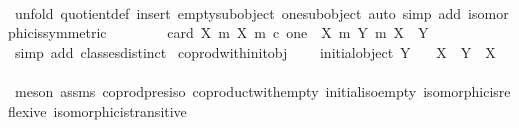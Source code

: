 \begin{isabellebody}
\ \ \ \ \ \ \isamarkupfalse%
\ {\isacharparenleft}{\kern0pt}unfold\ quotient{\isacharunderscore}{\kern0pt}def{\isacharcomma}{\kern0pt}\ insert\ empty{\isacharunderscore}{\kern0pt}subobject\ one{\isacharunderscore}{\kern0pt}subobject{\isacharcomma}{\kern0pt}\ auto\ simp\ add{\isacharcolon}{\kern0pt}\ isomorphic{\isacharunderscore}{\kern0pt}is{\isacharunderscore}{\kern0pt}symmetric{\isacharparenright}{\kern0pt}\isanewline
\ \ \isamarkupfalse%
\isanewline
\ \ \isamarkupfalse%
\ \isamarkupfalse%
\ {\isachardoublequoteopen}card\ {\isacharparenleft}{\kern0pt}{\isacharbraceleft}{\kern0pt}{\isacharparenleft}{\kern0pt}X{\isacharcomma}{\kern0pt}\ m{\isacharparenright}{\kern0pt}{\isachardot}{\kern0pt}\ {\isacharparenleft}{\kern0pt}X{\isacharcomma}{\kern0pt}\ m{\isacharparenright}{\kern0pt}\ {\isasymsubseteq}\isactrlsub c\ one{\isacharbraceright}{\kern0pt}\ {\isacharslash}{\kern0pt}{\isacharslash}{\kern0pt}\ {\isacharbraceleft}{\kern0pt}{\isacharparenleft}{\kern0pt}{\isacharparenleft}{\kern0pt}X{\isacharcomma}{\kern0pt}\ m{}{\isacharparenright}{\kern0pt}{\isacharcomma}{\kern0pt}\ {\isacharparenleft}{\kern0pt}Y{\isacharcomma}{\kern0pt}\ m{}{\isacharparenright}{\kern0pt}{\isacharparenright}{\kern0pt}{\isachardot}{\kern0pt}\ X\ {\isasymcong}\ Y{\isacharbraceright}{\kern0pt}{\isacharparenright}{\kern0pt}\ {\isacharequal}{\kern0pt}\ {}{\isachardoublequoteclose}\isanewline
\ \ \ \ \isamarkupfalse%
\ {\isacharparenleft}{\kern0pt}simp\ add{\isacharcolon}{\kern0pt}\ classes{\isacharunderscore}{\kern0pt}distinct{\isacharparenright}{\kern0pt}\isanewline
{}\isamarkupfalse%
%
\endisatagproof
{\isafoldproof}%
%
\isadelimproof
\isanewline
%
\endisadelimproof
\isanewline
{}\isamarkupfalse%
\ coprod{\isacharunderscore}{\kern0pt}with{\isacharunderscore}{\kern0pt}init{\isacharunderscore}{\kern0pt}obj{}{\isacharcolon}{\kern0pt}\ \isanewline
\ \ \ {\isachardoublequoteopen}initial{\isacharunderscore}{\kern0pt}object\ Y{\isachardoublequoteclose}\isanewline
\ \ \ {\isachardoublequoteopen}X\ {\isasymCoprod}\ Y\ {\isasymcong}\ X{\isachardoublequoteclose}\isanewline
%
\isadelimproof
\ \ %
\endisadelimproof
%
\isatagproof
{}\isamarkupfalse%
\ {\isacharparenleft}{\kern0pt}meson\ assms\ coprod{\isacharunderscore}{\kern0pt}pres{\isacharunderscore}{\kern0pt}iso\ coproduct{\isacharunderscore}{\kern0pt}with{\isacharunderscore}{\kern0pt}empty\ initial{\isacharunderscore}{\kern0pt}iso{\isacharunderscore}{\kern0pt}empty\ isomorphic{\isacharunderscore}{\kern0pt}is{\isacharunderscore}{\kern0pt}reflexive\ isomorphic{\isacharunderscore}{\kern0pt}is{\isacharunderscore}{\kern0pt}transitive{\isacharparenright}{\kern0pt}%

\end{isabellebody}

